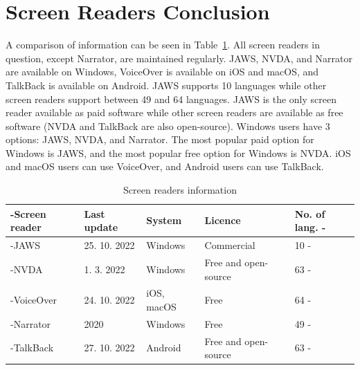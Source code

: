 \section{Screen Readers Conclusion}

A comparison of information can be seen in  Table~\ref{tab:screen-readers-info}. All screen readers in question, except Narrator, are maintained regularly. JAWS, NVDA, and Narrator are available on Windows, VoiceOver is available on iOS and macOS, and TalkBack is available on Android. JAWS supports 10 languages while other screen readers support between 49 and 64 languages. JAWS is the only screen reader available as paid software while other screen readers are available as free software (NVDA and TalkBack are also open-source). Windows users have 3 options: JAWS, NVDA, and Narrator. The most popular paid option for Windows is JAWS, and the most popular free option for Windows is NVDA. iOS and macOS users can use VoiceOver, and Android users can use TalkBack.

\begin{table}[tp]
\tablestretch
{}
\centering
\begin{tabularx}{\linewidth}
{>{\kern-\tabcolsep}lllXX<{\kern-\tabcolsep}}
\toprule
\textbf{Screen reader} & \textbf{Last update} & \textbf{System} & \textbf{Licence} & \textbf{No. of lang.} \\
\midrule
JAWS & 25. 10. 2022 & Windows & Commercial & 10 \\
%
NVDA & 1. 3. 2022 & Windows & Free and open-source & 63 \\
%
VoiceOver & 24. 10. 2022 & iOS, macOS & Free & 64 \\
%
Narrator & 2020 & Windows & Free & 49 \\
%
TalkBack & 27. 10. 2022 & Android & Free and open-source & 63 \\
\bottomrule
\end{tabularx}

\caption[Screen Readers Information]
{
Screen readers information
}
\label{tab:screen-readers-info}
\end{table}


